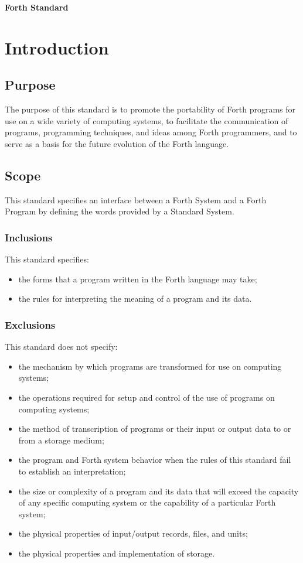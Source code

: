 {\Large\bfseries Forth \snapshot{} Standard}

\chapter{Introduction}
\label{chap:intro}

\section{Purpose}
The purpose of this standard is to promote the portability of Forth
programs for use on a wide variety of computing systems, to facilitate
the communication of programs, programming techniques, and ideas among
Forth programmers, and to serve as a basis for the future evolution of
the Forth language.

\section{Scope}
This standard specifies an interface between a Forth System and a
Forth Program by defining the words provided by a Standard System.

\subsection{Inclusions}
This standard specifies:
\begin{itemize}
\item the forms that a program written in the Forth language may take;
\item the rules for interpreting the meaning of a program and its data.
\end{itemize}

\subsection{Exclusions} %
\label{intro:exclusions}

This standard does not specify:
\begin{itemize}
\item the mechanism by which programs are transformed for use on
	computing systems;
\item the operations required for setup and control of the use of
	programs on computing systems;
\item the method of transcription of programs or their input or
	output data to or from a storage medium;
\item the program and Forth system behavior when the rules of this
	standard fail to establish an interpretation;
\item the size or complexity of a program and its data that will
	exceed the capacity of any specific computing system or the
	capability of a particular Forth system;
\item the physical properties of input/output records, files, and units;
\item the physical properties and implementation of storage.
\end{itemize}

